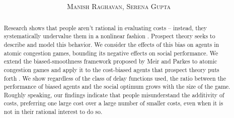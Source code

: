 \documentclass[twoside]{article}
\title{\vspace{-15mm}\fontsize{24pt}{10pt}\selectfont\textbf{\titlee}} %
\author{
\large
\textsc{Manish Raghavan, Serena Gupta}
\vspace{-5mm}
}
\begin{document}
\maketitle %

\thispagestyle{fancy} %

\begin{abstract}

  Research shows that people aren't rational in evaluating costs --
  instead, they systematically undervalue them in a nonlinear fashion
  \cite{Kahneman1979}. Prospect theory seeks to describe and model this
  behavior. We consider the effects of this bias on agents in atomic congestion
  games, bounding its negative effects on social performance. We extend the
  biased-smoothness framework proposed by Meir and Parkes to atomic congestion
  games and apply it to the cost-biased agents that prospect theory puts forth
  \cite{Meir2014}. We show regardless of the class of delay functions used, the
  ratio between the performance of biased agents and the social optimum grows
  with the size of the game. Roughly speaking, our findings indicate that people
  misunderstand the additivity of costs, preferring one large cost over a large
  number of smaller costs, even when it is not in their rational interest to do
  so.

\end{abstract}
\end{document}
